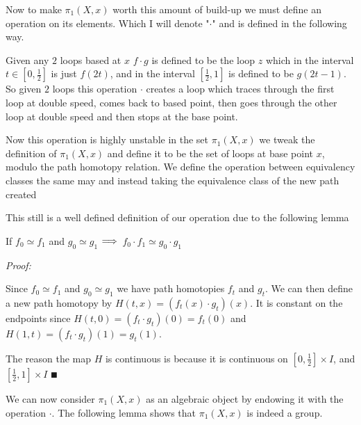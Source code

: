 \documentclass[paper=a4,fontsize=paper,12.5pt]{book}
\newcommand{\3}{\vspace*{3mm}}
\newcommand{\Proof}{\textit{Proof:}}
\newcommand{\RIGHT}{\Longrightarrow \hspace*{.5mm}}
\newcommand{\Fund}[2]{{\pi}_{1}(#1,#2)}
\begin{document}
\3

Now to make ${\pi}_{1}(X,{x})$ worth this amount of build-up we must define an operation on its elements. Which I will denote "$\cdot$" and is defined in the following way.

\3

Given any $2$ loops based at $x$ $f \cdot g$ is defined to be the loop $z$ which in the interval $t \in [0,\frac{1}{2}]$ is just $f(2t)$, and in the interval $[\frac{1}{2},1]$ is defined to be $g(2t-1)$. So given $2$ loops this operation $\cdot$ creates a loop which traces through the first loop at double speed, comes back to based point, then goes through the other loop at double speed and then stops at the base point.

\3

Now this operation is highly unstable in the set ${\pi}_{1}(X,{x})$ we tweak the definition of ${\pi}_{1}(X,{x})$ and define it to be the set of loops at base point $x$, modulo the path homotopy relation. We define the operation between equivalency classes the same may and instead taking the equivalence class of the new path created

\3

This still is a well defined definition of our operation due to the following lemma

\3

\begin{lemma}

If ${f}_{0} \simeq {f}_{1}$ and ${g}_{0} \simeq {g}_{1}$ $\RIGHT$ ${f}_{0} \cdot {f}_{1} \simeq {g}_{0} \cdot {g}_{1}$


\end{lemma}

\Proof

Since ${f}_{0} \simeq {f}_{1}$ and ${g}_{0} \simeq {g}_{1}$ we have path homotopies ${f}_{t}$ and ${g}_{t}$. We can then define a new path homotopy by $H(t,x) = ({f}_{t}(x) \cdot {g}_{t})(x)$. It is constant on the endpoints since $H(t,0) = ({f}_{t} \cdot {g}_{t})(0) = {f}_{t}(0)$ and $H(1,t) = ({f}_{t} \cdot {g}_{t})(1) = {g}_{t}(1)$. 

\3

The reason the map $H$ is continuous is because it is continuous on $[0,\frac{1}{2}] \times I$, and $[\frac{1}{2},1] \times I$ $\QED$

\3

We can now consider $\Fund{X}{x}$ as an algebraic object by endowing it with the operation $\cdot$. The following lemma shows that $\Fund{X}{x}$ is indeed a group.
\end{document}
